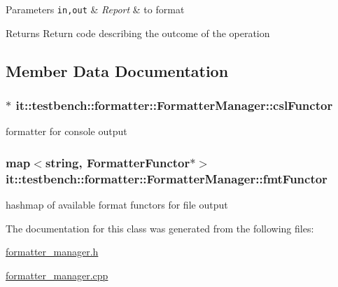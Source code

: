 \begin{DoxyParams}[1]{Parameters}
\mbox{\tt in,out}  & {\em Report} & to format \\
\hline
\end{DoxyParams}
\begin{DoxyReturn}{Returns}
Return code describing the outcome of the operation 
\end{DoxyReturn}


\subsection{Member Data Documentation}
\hypertarget{classit_1_1testbench_1_1formatter_1_1FormatterManager_a47578a7455b65cfaa1ab3c42df2c7c84}{
\subsubsection[{csl\-Functor}]{$\ast$ it\-::testbench\-::formatter\-::\-Formatter\-Manager\-::csl\-Functor\hspace{0.3cm}{\ttfamily [private]}}}\label{da/daa/classit_1_1testbench_1_1formatter_1_1FormatterManager_a47578a7455b65cfaa1ab3c42df2c7c84}
formatter for console output \hypertarget{classit_1_1testbench_1_1formatter_1_1FormatterManager_abd0281f3608746fb1f324154526c87e7}{
\subsubsection[{fmt\-Functor}]{\setlength{\rightskip}{0pt plus 5cm}map$<$string, {\bf Formatter\-Functor}$\ast$$>$ it\-::testbench\-::formatter\-::\-Formatter\-Manager\-::fmt\-Functor\hspace{0.3cm}{\ttfamily [private]}}}\label{da/daa/classit_1_1testbench_1_1formatter_1_1FormatterManager_abd0281f3608746fb1f324154526c87e7}
hashmap of available format functors for file output 

The documentation for this class was generated from the following files\-:\begin{DoxyCompactItemize}
\item 
\hyperlink{formatter__manager_8h}{formatter\-\_\-manager.\-h}\item 
\hyperlink{formatter__manager_8cpp}{formatter\-\_\-manager.\-cpp}\end{DoxyCompactItemize}
